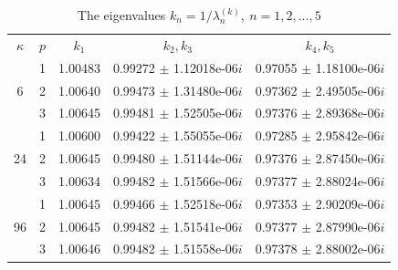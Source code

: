 \documentclass[authoryear]{elsarticle}
\begin{document}
\begin{table}[h]
\caption{The eigenvalues $k_n = 1 / \lambda_n^{(k)}, \ n = 1,2, ..., 5$}
\label{t-2}
\begin{center}
\begin{tabular}{ccccc}
\rowcolor{col1}
$\kappa$ & $p$ & $k_1$ &  $k_2, k_3$ &  $k_4,k_5$ \\ 
\rowcolor{col3}
   & 1 & 1.00483 & 0.99272 $\pm$ 1.12018e-06$i$  & 0.97055 $\pm$ 1.18100e-06$i$  \\
\rowcolor{col2}
 6 & 2 & 1.00640 & 0.99473 $\pm$ 1.31480e-06$i$  & 0.97362 $\pm$ 2.49505e-06$i$  \\
\rowcolor{col1}
   & 3 & 1.00645 & 0.99481 $\pm$ 1.52505e-06$i$  & 0.97376 $\pm$ 2.89368e-06$i$  \\
\rowcolor{col3}
   & 1 & 1.00600 & 0.99422 $\pm$ 1.55055e-06$i$  & 0.97285 $\pm$ 2.95842e-06$i$  \\
\rowcolor{col2}
24 & 2 & 1.00645 & 0.99480 $\pm$ 1.51144e-06$i$  & 0.97376 $\pm$ 2.87450e-06$i$  \\
\rowcolor{col1}
   & 3 & 1.00634 & 0.99482 $\pm$ 1.51566e-06$i$  & 0.97377 $\pm$ 2.88024e-06$i$  \\
\rowcolor{col3}
   & 1 & 1.00645 & 0.99466 $\pm$ 1.52518e-06$i$  & 0.97353 $\pm$ 2.90209e-06$i$  \\
\rowcolor{col2}
96 & 2 & 1.00645 & 0.99482 $\pm$ 1.51541e-06$i$  & 0.97377 $\pm$ 2.87990e-06$i$  \\
\rowcolor{col1}
   & 3 & 1.00646 & 0.99482 $\pm$ 1.51558e-06$i$  & 0.97378 $\pm$ 2.88002e-06$i$  \\
\end{tabular}
\end{center}
\end{table}
\end{document}

